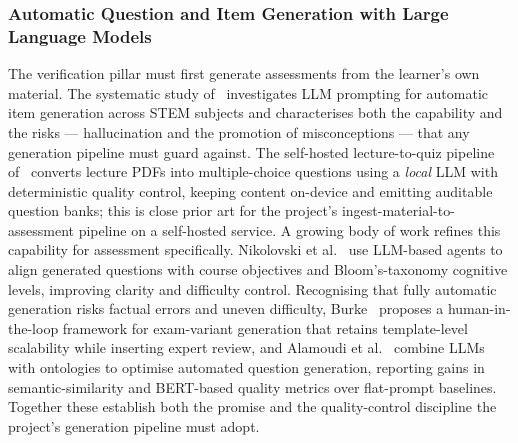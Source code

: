\documentclass[12pt]{report}
\begin{document}
\subsubsection{Automatic Question and Item Generation with Large Language Models}
The verification pillar must first generate assessments from the learner's own material.
The systematic study of~\cite{itemgen2024} investigates LLM prompting for automatic item
generation across STEM subjects and characterises both the capability and the risks ---
hallucination and the promotion of misconceptions --- that any generation pipeline must
guard against. The self-hosted lecture-to-quiz pipeline of~\cite{lecturequiz2026} converts
lecture PDFs into multiple-choice questions using a \emph{local} LLM with deterministic
quality control, keeping content on-device and emitting auditable question banks; this is
close prior art for the project's ingest-material-to-assessment pipeline on a self-hosted
service. A growing body of work refines this capability for assessment specifically.
Nikolovski et al.~\cite{nikolovski2025} use LLM-based agents to align generated questions
with course objectives and Bloom's-taxonomy cognitive levels, improving clarity and
difficulty control. Recognising that fully automatic generation risks factual errors and
uneven difficulty, Burke~\cite{burke2025} proposes a human-in-the-loop framework for
exam-variant generation that retains template-level scalability while inserting expert
review, and Alamoudi et al.~\cite{alamoudi2025} combine LLMs with ontologies to optimise
automated question generation, reporting gains in semantic-similarity and BERT-based
quality metrics over flat-prompt baselines. Together these establish both the promise and
the quality-control discipline the project's generation pipeline must adopt.
\end{document}
